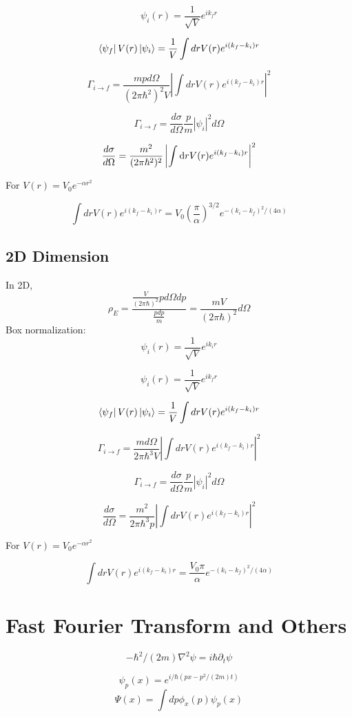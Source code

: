 \documentclass[12pt,twoside]{article}
\def\df{{\rm d}}
\begin{document}
$$
\psi_i(r) = \frac{1}{\sqrt{V}} e^{i k_f r}
$$

$$
\bra{\psi_f} V(r) \ket{\psi_i} =  \frac{1}{V} \int dr V(r) e^{i(k_f - k_i) r}
$$

$$
\Gamma_{i\rightarrow f} = \frac{mp d\Omega}{(2\pi \hbar^2)^2 V} \left|\int dr V(r) e^{i(k_f - k_i) r} \right|^2
$$

$$
\Gamma_{i\rightarrow f} = \frac{d\sigma}{d\Omega} \frac{p}{m} |\psi_i|^2 d\Omega
$$

$$
\frac{d\sigma}{d\Omega} = \frac{m^2}{(2\pi \hbar^2)^2} \left|\int \df r V(r) e^{i(k_f - k_i) r}\right|^2
$$

For $V(r) = V_0 e^{-\alpha r^2}$

$$
\int dr V(r) e^{i(k_f - k_i) r} = V_0 (\frac{\pi}{\alpha})^{3/2} e^{-(k_i - k_f)^2/(4\alpha)}
$$


\subsection{2D Dimension}

In 2D,
$$
\rho_E = \frac{
\frac{V}{(2\pi\hbar)^2}{ p d\Omega dp}
}{
\frac{p dp}{m}
}
=
\frac{m V}{(2\pi\hbar)^2}{d\Omega}
$$
Box normalization:
$$
\psi_i(r) = \frac{1}{\sqrt{V}} e^{i k_i r}
$$

$$
\psi_i(r) = \frac{1}{\sqrt{V}} e^{i k_f r}
$$

$$
\bra{\psi_f} V(r) \ket{\psi_i} =  \frac{1}{V} \int dr V(r) e^{i(k_f - k_i) r}
$$

$$
\Gamma_{i\rightarrow f} = \frac{m d\Omega}{2\pi \hbar^3 V} \left|\int dr V(r) e^{i(k_f - k_i) r}\right|^2
$$

$$
\Gamma_{i\rightarrow f} = \frac{d\sigma}{d\Omega} \frac{p}{m} |\psi_i|^2 d\Omega
$$

$$
\frac{d\sigma}{d\Omega} = \frac{m^2}{2\pi \hbar^3 p} \left|\int dr V(r) e^{i(k_f - k_i) r}\right|^2
$$

For $V(r) = V_0 e^{-\alpha r^2}$

$$
\int dr V(r) e^{i(k_f - k_i) r} = \frac{V_0 \pi}{\alpha} e^{-(k_i - k_f)^2/(4\alpha)}
$$



\section{Fast Fourier Transform and Others}

$$
-\hbar^2/(2m) \nabla^2 \psi = i \hbar \partial_t \psi
$$

$$
\psi_p(x) = e^{ i/\hbar (p x - p^2 /(2m)t)}
$$
$$
\Psi(x) = \int dp \phi_x(p) \psi_p(x)
$$
\end{document}
